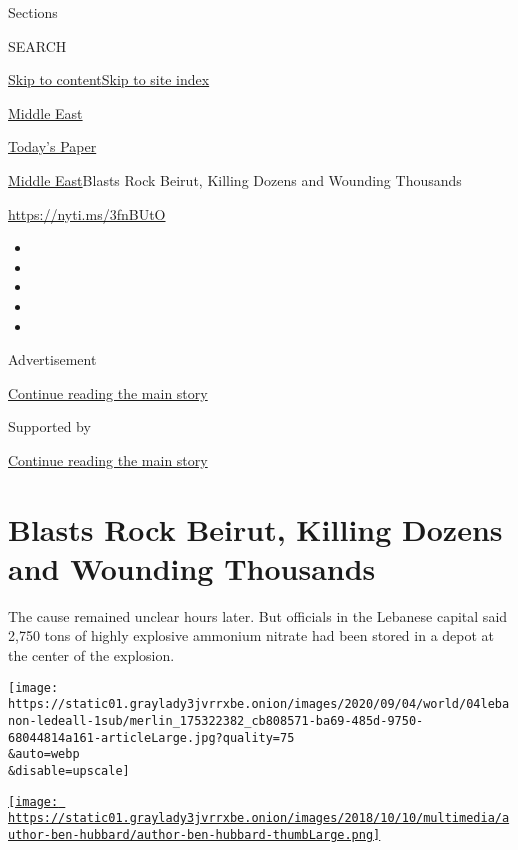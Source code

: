 Sections

SEARCH

\protect\hyperlink{site-content}{Skip to
content}\protect\hyperlink{site-index}{Skip to site index}

\href{https://www.nytimes3xbfgragh.onion/section/world/middleeast}{Middle
East}

\href{https://myaccount.nytimes3xbfgragh.onion/auth/login?response_type=cookie\&client_id=vi}{}

\href{https://www.nytimes3xbfgragh.onion/section/todayspaper}{Today's
Paper}

\href{/section/world/middleeast}{Middle East}\textbar{}Blasts Rock
Beirut, Killing Dozens and Wounding Thousands

\url{https://nyti.ms/3fnBUtO}

\begin{itemize}
\item
\item
\item
\item
\item
\end{itemize}

Advertisement

\protect\hyperlink{after-top}{Continue reading the main story}

Supported by

\protect\hyperlink{after-sponsor}{Continue reading the main story}

\hypertarget{blasts-rock-beirut-killing-dozens-and-wounding-thousands}{%
\section{Blasts Rock Beirut, Killing Dozens and Wounding
Thousands}\label{blasts-rock-beirut-killing-dozens-and-wounding-thousands}}

The cause remained unclear hours later. But officials in the Lebanese
capital said 2,750 tons of highly explosive ammonium nitrate had been
stored in a depot at the center of the explosion.

\texttt{[image: https://static01.graylady3jvrrxbe.onion/images/2020/09/04/world/04lebanon-ledeall-1sub/merlin\_175322382\_cb808571-ba69-485d-9750-68044814a161-articleLarge.jpg?quality=75\\\&auto=webp\\\&disable=upscale]}

\href{https://www.nytimes3xbfgragh.onion/by/ben-hubbard}{\texttt{[image: https://static01.graylady3jvrrxbe.onion/images/2018/10/10/multimedia/author-ben-hubbard/author-ben-hubbard-thumbLarge.png]}}

